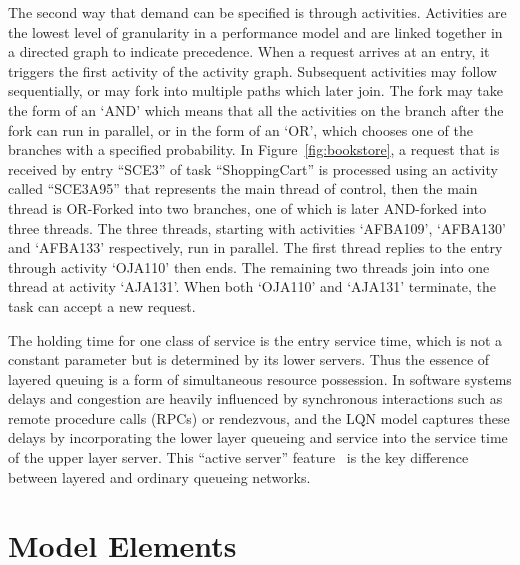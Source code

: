 The second way that demand can be specified is through
activities.  Activities are the lowest level of
granularity in a performance model and are linked together in a
directed graph to indicate precedence.
When a request arrives at an entry, it triggers the first activity of
the activity graph.  Subsequent activities may
follow sequentially, or may fork into multiple paths which
later join.  The fork may take the form of an `AND' which
means that all the activities on the branch after
the fork can run in parallel, or in the form of an `OR', which chooses
one of the branches with a specified
probability.  In Figure~\ref{fig:bookstore},
a request that is received by entry ``SCE3'' of task ``ShoppingCart''
is processed using an activity called ``SCE3A95'' that represents the
main thread of control, then the main thread is
OR-Forked into two branches, one of which is later
AND-forked into three threads.  The three threads,
starting with activities `AFBA109', `AFBA130' and `AFBA133'
respectively, run in parallel.  The first thread
replies to the entry
through activity `OJA110' then ends.  The remaining two threads join
into one thread at activity `AJA131'.  When both `OJA110' and `AJA131'
terminate, the task can accept a new request.

The holding time for one class of service is the
entry service time, which is not a constant parameter but is
determined by its lower servers.  Thus the essence of layered queuing
is a form of simultaneous resource
possession. In software
systems delays and congestion are heavily influenced by
synchronous interactions such as remote
procedure calls (RPCs) or
rendezvous, and the LQN model captures these delays
by incorporating the lower layer queueing and service into the service
time of the upper layer server.  This ``active
server''
feature~\cite{srvn:woodside-94-ieeetc-srvn} is the key difference between layered
and ordinary queueing networks.

\section{Model Elements}
\label{sec:elements}

